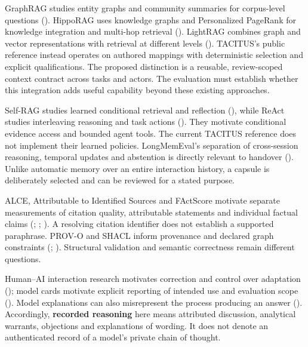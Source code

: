 \documentclass[
  11pt,
]{article}
\begin{document}
GraphRAG studies entity graphs and community summaries for corpus-level
questions (). HippoRAG uses
knowledge graphs and Personalized PageRank for knowledge integration and
multi-hop retrieval (). LightRAG combines graph and vector representations with
retrieval at different levels ().
TACITUS's public reference instead operates on authored mappings with
deterministic selection and explicit qualifications. The proposed
distinction is a reusable, review-scoped context contract across tasks
and actors. The evaluation must establish whether this integration adds
useful capability beyond these existing approaches.

Self-RAG studies learned conditional retrieval and reflection
(), while ReAct studies
interleaving reasoning and task actions (). They motivate conditional evidence access and bounded agent
tools. The current TACITUS reference does not implement their learned
policies. LongMemEval's separation of cross-session reasoning, temporal
updates and abstention is directly relevant to handover
(). Unlike automatic memory over an
entire interaction history, a capsule is deliberately selected and can
be reviewed for a stated purpose.

ALCE, Attributable to Identified Sources and FActScore motivate separate
measurements of citation quality, attributable statements and individual
factual claims (;
;
). A resolving citation
identifier does not establish a supported paraphrase. PROV-O and SHACL
inform provenance and declared graph constraints
(;
). Structural
validation and semantic correctness remain different questions.

Human--AI interaction research motivates correction and control over
adaptation (); model
cards motivate explicit reporting of intended use and evaluation scope
(). Model explanations
can also misrepresent the process producing an answer
(). Accordingly,
\textbf{recorded reasoning} here means attributed discussion, analytical
warrants, objections and explanations of wording. It does not denote an
authenticated record of a model's private chain of thought.
\end{document}
